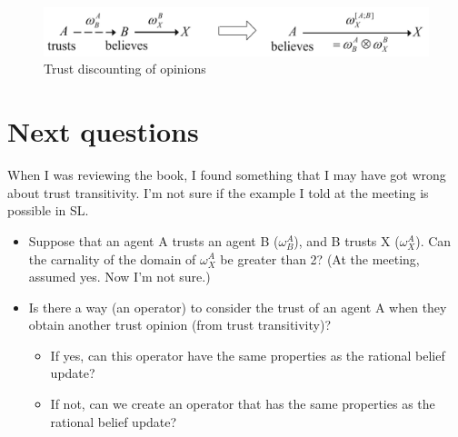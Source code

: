 \documentclass[a4paper,12pt]{article}
\theoremstyle{definition}
\numberwithin{equation}{section}
\begin{document}
\begin{figure}[htb]
	\centering
	\includegraphics[scale=0.3]{images/trust-discounting-of-opinions.png}
	\caption{Trust discounting of opinions}
\end{figure}


%
%	
%	

\section{Next questions}

When I was reviewing the book, I found something that I may have got wrong about trust transitivity. I'm not sure if the example I told at the meeting is possible in SL.

\begin{itemize}
	\item Suppose that an agent A trusts an agent B ($\omega^A_B$), and B trusts X ($\omega^A_X$). Can the carnality of the domain of $\omega^A_X$ be greater than 2? (At the meeting, assumed yes. Now I'm not sure.)
	
	\item Is there a way (an operator) to consider the trust of an agent A when they obtain another trust opinion (from trust transitivity)?
	
	\begin{itemize}
		\item If yes, can this operator have the same properties as the rational belief update?
		
		\item If not, can we create an operator that has the same properties as the rational belief update?
	\end{itemize}
\end{itemize}


%
%
\end{document}
